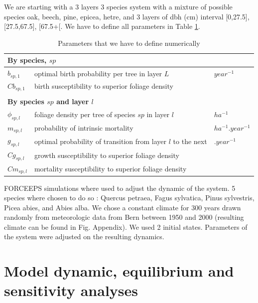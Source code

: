 \documentclass{article}
\begin{document}
We are starting with a 3 layers 3 species system with a mixture of possible species oak, beech, pine, epicea, hetre, and 3 layers of dbh (cm) interval [0,27.5], [27.5,67.5], [67.5+[. We have to define all parameters in Table \ref{tab:coeftoparam}.

\begin{table}[H]
    \centering
    \begin{tabular}{l l l}
    \hline
    \hline
    \multicolumn{3}{l}{\textbf{By species}, $sp$} \\
    \hline
    $b_{sp,1}$     & optimal birth probability per tree in layer $L$ & $year^{-1}$ \\
    $Cb_{sp,1}$    & birth susceptibility to superior foliage density& \\
    \\
    \multicolumn{3}{l}{\textbf{By species $sp$ and layer $l$}} \\
    \hline
    $\phi_{sp,l}$  & foliage density per tree of species $sp$ in layer $l$  & $ha^{-1}$  \\
    $m_{sp,l}$     & probability of intrinsic mortality                     & $ha^{-1}.year^{-1}$ \\  
    $g_{sp,l}$     & optimal probability of transition from layer $l$ to the next   & $.year^{-1}$ \\
    $Cg_{sp,l}$    & growth susceptibility to superior foliage density      &            \\
    $Cm_{sp,l}$    & mortality susceptibility to superior foliage density   &            \\
    \hline
    \hline
    \end{tabular}
    \caption{Parameters that we have to define numerically}
    \label{tab:coeftoparam}
\end{table}

FORCEEPS simulations where used to adjust the dynamic of the system. 5 species where chosen to do so : Quercus petraea, Fagus sylvatica, Pinus sylvestris, Picea abies, and Abies alba. We chose a constant climate for 300 years drawn randomly from meteorologic data from Bern between 1950 and 2000 (resulting climate can be found in Fig. Appendix). We used 2 initial states. Parameters of the system were adjusted on the resulting dynamics.\\

\section{Model dynamic, equilibrium and sensitivity analyses}
\end{document}
